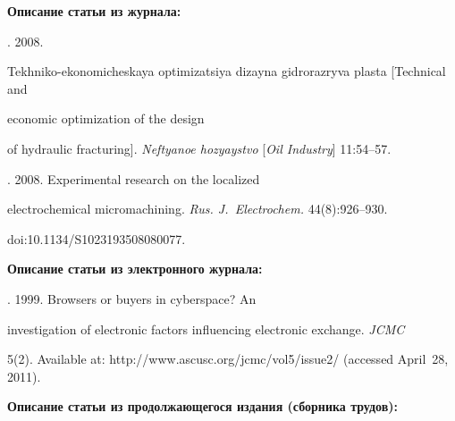{\begin{enumerate}[1.]


 \def\rightfootline{\ } %







{\small





\noindent


\textbf{Описание статьи из журнала:}





. 2008.


Tekhniko-ekonomicheskaya optimizatsiya dizayna gidrorazryva plasta [Technical and


economic optimization of the design


of hydraulic fracturing]. \textit{Neftyanoe hozyaystvo} [\textit{Oil Industry}] 11:54--57.





. 2008. Experimental research on the localized


electrochemical micromachining. \textit{Rus. J.~Electrochem.}  44(8):926--930.


{\sf doi:10.1134/S1023193508080077}.





\noindent


\textbf{Описание статьи из электронного журнала:}





. 1999. Browsers or buyers in cyberspace? An


investigation of electronic factors influencing electronic exchange. \textit{JCMC}


5(2). Available at: {\sf http://www.ascusc.org/jcmc/vol5/issue2/} (accessed April~28, 2011).














\noindent


\textbf{Описание статьи из продолжающегося издания (сборника трудов):}





}
\end{enumerate}}
